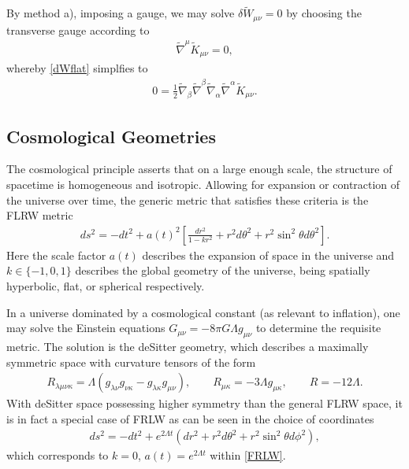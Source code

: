 \documentclass[10pt,letterpaper]{article}
\numberwithin{equation}{section}
\begin{document}
\indent By method a), imposing a gauge, we may solve $\delta \tilde W_{\mu\nu} = 0$ by choosing the transverse gauge according to
\begin{eqnarray}
\tilde\nabla^\mu \tilde K_{\mu\nu} = 0,
\end{eqnarray}
whereby \eqref{dWflat} simplfies to
\begin{eqnarray}
0 = \tfrac{1}{2} \tilde\nabla_{\beta }\tilde\nabla^{\beta }\tilde\nabla_{\alpha }\tilde\nabla^{\alpha }\tilde K_{\mu \nu }.
\end{eqnarray}
\subsection{Cosmological Geometries}
\label{sec:Cosmological Geometries}
The cosmological principle asserts that on a large enough scale, the structure of spacetime is homogeneous and isotropic. Allowing for expansion or contraction of the universe over time, the generic metric that satisfies these criteria is the FLRW \cite{Kodama1984} metric
\begin{eqnarray}
ds^2 = -dt^2 + a(t)^2\left[ \frac{dr^2}{1-kr^2} + r^2d\theta^2 + r^2\sin^2\theta d\theta^2\right]. 
\label{FRLW}
\end{eqnarray}
Here the scale factor $a(t)$ describes the expansion of space in the universe and $k \in \{-1,0,1\}$ describes the global geometry of the universe, being spatially hyperbolic, flat, or spherical respectively. 

\indent In a universe dominated by a cosmological constant (as relevant to inflation), one may solve the Einstein equations $G_{\mu\nu} = -8\pi G \Lambda g_{\mu\nu}$ to determine the requisite metric. The solution is the deSitter geometry, which describes a maximally symmetric space with curvature tensors of the form
\begin{eqnarray}
R_{\lambda\mu\nu\kappa} = \Lambda (g_{\lambda\nu}g_{\nu\kappa}-g_{\lambda\kappa}g_{\mu\nu}),
\qquad R_{\mu\kappa} = -3\Lambda g_{\mu\kappa},\qquad R=-12\Lambda.
\end{eqnarray} 
With deSitter space possessing higher symmetry than the general FLRW space, it is in fact a special case of FRLW as can be seen in the choice of coordinates 
\begin{eqnarray}
ds^2 = -dt^2 + e^{2\Lambda t} (dr^2 + r^2d\theta^2 + r^2\sin^2\theta d\phi^2),
\end{eqnarray}
which corresponds to $k=0$, $a(t) = e^{2\Lambda t}$ within \eqref{FRLW}. 
\end{document}
